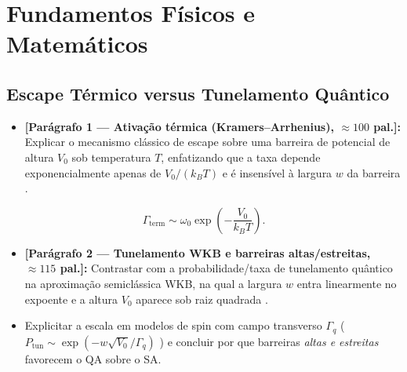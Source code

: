 \documentclass[aps,pre,twocolumn,10pt,superscriptaddress,nofootinbib]{revtex4-2}
\begin{document}
\section{Fundamentos Físicos e Matemáticos}
\label{sec:fundamentos}

\subsection{Escape Térmico versus Tunelamento Quântico}
\label{subsec:escape_vs_tunelamento}

\begin{itemize}
  \item \textbf{[Parágrafo 1 --- Ativação térmica (Kramers--Arrhenius), $\approx 100$ pal.]:}
        Explicar o mecanismo clássico de escape sobre uma barreira de potencial de altura $V_0$ sob temperatura $T$, enfatizando que a taxa depende exponencialmente apenas de $V_0 / (k_B T)$ e é insensível à largura $w$ da barreira \cite{Das2008,Chakrabarti2022}.
\end{itemize}

\begin{equation}
  \Gamma_{\text{term}} \sim \omega_0 \exp\!\left( -\frac{V_0}{k_B T} \right).
  \label{eq:kramers_arrhenius}
\end{equation}

\begin{itemize}
  \item \textbf{[Parágrafo 2 --- Tunelamento WKB e barreiras altas/estreitas, $\approx 115$ pal.]:}
        Contrastar com a probabilidade/taxa de tunelamento quântico na aproximação semiclássica WKB, na qual a largura $w$ entra linearmente no expoente e a altura $V_0$ aparece sob raiz quadrada \cite{Das2008,Chakrabarti2022}.
  \item Explicitar a escala em modelos de spin com campo transverso $\Gamma_q$ ($P_{\text{tun}} \sim \exp(-w\sqrt{V_0}/\Gamma_q)$ \cite{Chakrabarti2022}) e concluir por que barreiras \emph{altas e estreitas} favorecem o QA sobre o SA.
\end{itemize}
\end{document}
